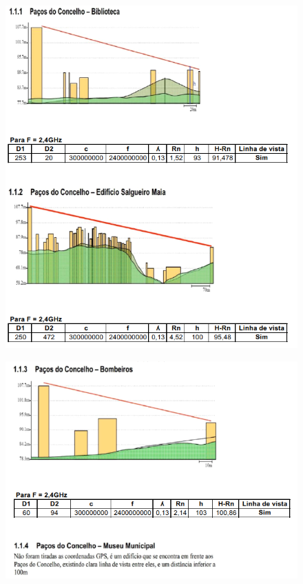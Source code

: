 \documentclass[a4paper,titlepage]{article}
\begin{document}
		\begin{figure}[H]
											\centering
											\includegraphics[width=\linewidth]{Img1.png}
		\end{figure}
		\begin{figure}[H]
											\centering
											\includegraphics[width=\linewidth]{Img2.png}
		\end{figure}
\end{document}
